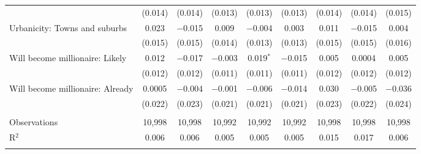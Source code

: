 \begin{tabular}{@{\extracolsep{5pt}}lcccccccc}
  & (0.014) & (0.014) & (0.013) & (0.013) & (0.013) & (0.014) & (0.014) & (0.015) \\ 
  Urbanicity: Towns and suburbs & 0.023 & $-$0.015 & 0.009 & $-$0.004 & 0.003 & 0.011 & $-$0.015 & 0.004 \\ 
  & (0.015) & (0.015) & (0.014) & (0.013) & (0.013) & (0.015) & (0.015) & (0.016) \\ 
  Will become millionaire: Likely & 0.012 & $-$0.017 & $-$0.003 & 0.019$^{*}$ & $-$0.015 & 0.005 & 0.0004 & 0.005 \\ 
  & (0.012) & (0.012) & (0.011) & (0.011) & (0.011) & (0.012) & (0.012) & (0.012) \\ 
  Will become millionaire: Already & 0.0005 & $-$0.004 & $-$0.001 & $-$0.006 & $-$0.014 & 0.030 & $-$0.005 & $-$0.036 \\ 
  & (0.022) & (0.023) & (0.021) & (0.021) & (0.021) & (0.023) & (0.022) & (0.024) \\ 
 \hline \\[-1.8ex] 

Observations & 10,998 & 10,998 & 10,992 & 10,992 & 10,992 & 10,998 & 10,998 & 10,998 \\ 
R$^{2}$ & 0.006 & 0.006 & 0.005 & 0.005 & 0.005 & 0.015 & 0.017 & 0.006 \\ 
\hline 
\hline \\[-1.8ex] 
\end{tabular} 